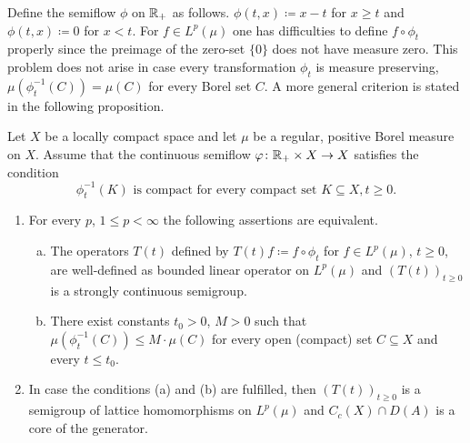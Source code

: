 Define the semiflow $\phi$ on $\mathbb{R} _+$ as follows. 
$\phi(t,x) \coloneq  x-t$ for $x \geq t$ and $\phi(t,x) \coloneq  0$ for $x < t$. 
For $f \in L^p(\mu)$ one has difficulties to define $f \circ \phi_t$ properly since the preimage of the zero-set $\{0\}$ does
not have measure zero. This problem does not arise in case every
transformation $\phi_t$ is measure preserving, \ie  $\mu(\phi_t^{-1}(C)) = \mu(C)$
for every Borel set $C$. A more general criterion is stated in the
following proposition.
\begin{proposition}\label{prop:c3-4.11}
Let $X$ be a locally compact space and let $\mu$ be a
regular, positive Borel measure on $X$. Assume that the continuous
semiflow $\phi \colon \R _+ \times X \to X$ satisfies the condition
\begin{equation}\label{eq:c3-4.12}
	\phi_t^{-1}(K)  \text{ is compact for every compact set }  K \subseteq X , t \geq 0 .
\end{equation}
\begin{enumerate}[\upshape (i)]
\item		
For every $p$, $1 \leq p < \infty$ the following assertions are equivalent.
\begin{enumerate} [(a)]
\item
The operators $T(t)$ defined by $T(t)f \coloneq  f \circ \phi_t$ for $f \in L^p(\mu)$, $t \geq 0$, are well-defined as bounded linear operator on $L^p(\mu)$ and $(T(t))_{t \geq 0}$ is a strongly continuous semigroup.
			
\item 
There exist constants $t_0 > 0$, $M > 0$ such that $\mu(\phi_t^{-1}(C)) \leq M \cdot \mu(C)$ for every open (compact) set $C \subseteq X$ and every $t \leq t_0$.
\end{enumerate}
	
\item 
In case the conditions (a) and (b) are fulfilled, then $(T(t))_{t \geq 0}$ is a semigroup of lattice homomorphisms on $L^p(\mu)$ and $C_c(X) \cap D(A)$ is a core%
of the generator.
\end{enumerate}
\end{proposition}
